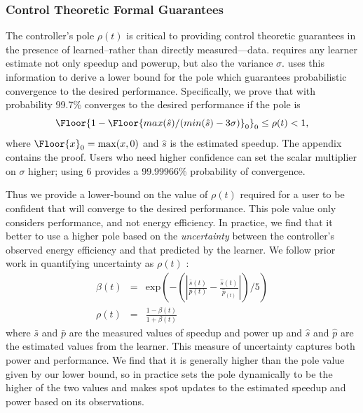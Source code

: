 \subsubsection{Control Theoretic Formal Guarantees}
\label{sec:guarantees}
The controller's pole $\rho(t)$ is critical to providing control
theoretic guarantees in the presence of learned--rather than directly
measured---data.  \SYSTEM{} requires any learner estimate not only
speedup and powerup, but also the variance $\sigma$.  \SYSTEM{} uses
this information to derive a lower bound for the pole which guarantees
probabilistic convergence to the desired performance. Specifically, we
prove that with probability 99.7\% \SYSTEM{} converges to the desired
performance if the pole is
$$\Floor{1- \Floor{max(\hat{s})/(min(\hat{s}) - 3\sigma)}_0}_0 \leq \rho(t)
< 1,$$ where $\Floor{x}_0 = \max(x,0)$ and $\hat{s}$ is the estimated
speedup. The appendix contains the proof. Users who need higher
confidence can set the scalar multiplier on $\sigma$ higher; \eg{}
using $6$ provides a 99.99966\% probability of convergence.

Thus we provide a lower-bound on the value of $\rho(t)$ required for a
user to be confident that \SYSTEM{} will converge to the desired
performance.  This pole value only considers performance, and not
energy efficiency.  In practice, we find that it better to use a
higher pole based on the \emph{uncertainty} between the controller's
observed energy efficiency and that predicted by the learner.  We
follow prior work in quantifying uncertainty as $\rho(t) $
\cite{Tokic2010}:
\begin{equation}
  \begin{array}{rcl}
    \beta(t) &=&  \text{exp}{\left(- \left( \left|   \frac{\bar{s}(t)}{\bar{p}(t)}  -\frac{ \hat{s}(t)}{\hat{p}_(t)} \right| \right) /5\right)} \\
    \rho(t) &=& \frac{1-\beta(t)}{1+\beta(t)} 
  \end{array}
  \label{eqn:uncer}
\end{equation}
where $\bar{s}$ and $\bar{p}$ are the measured values of speedup and
power up and $\hat{s}$ and $\hat{p}$ are the estimated values from the
learner.  This measure of uncertainty captures both power and
performance.  We find that it is generally higher than the pole value
given by our lower bound, so in practice \SYSTEM{} sets the pole
dynamically to be the higher of the two values and \SYSTEM{} makes
spot updates to the estimated speedup and power based on its
observations.
